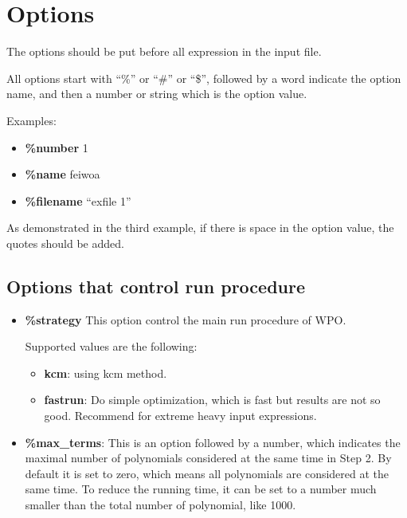 \documentclass[a4paper]{article}
\begin{document}
\section{Options}
The options should be put before all expression in the input file.

All options start with ``\%'' or ``\#'' or ``\$'', followed by a word indicate the option name, and then a number or string which is the option value. 

Examples:
\begin{itemize}
\item \textbf{\%number} 1
\item \textbf{\%name} feiwoa
\item \textbf{\%filename} ``exfile 1''
\end{itemize}

As demonstrated in the third example, if there is space in the option value, the quotes should be added.

\subsection{Options that control run procedure}
\begin{itemize}
\item \textbf{\%strategy}
This option control the main run procedure of WPO.

Supported values are the following:
\begin{itemize}
  \item \textbf{kcm}: using kcm method.
\item \textbf{fastrun}: Do simple optimization, which is fast but results are not so good. Recommend for extreme heavy input expressions.
\end{itemize}

\item \textbf{\%max\_terms}: This is an option followed by a number,
    which indicates the maximal number of polynomials considered at the same time in Step 2. By default it is set to zero, which means all polynomials are considered at the same time.
        To reduce the running time, it can be set to a number much smaller than the total number of polynomial, like 1000.
\end{itemize}
\end{document}
